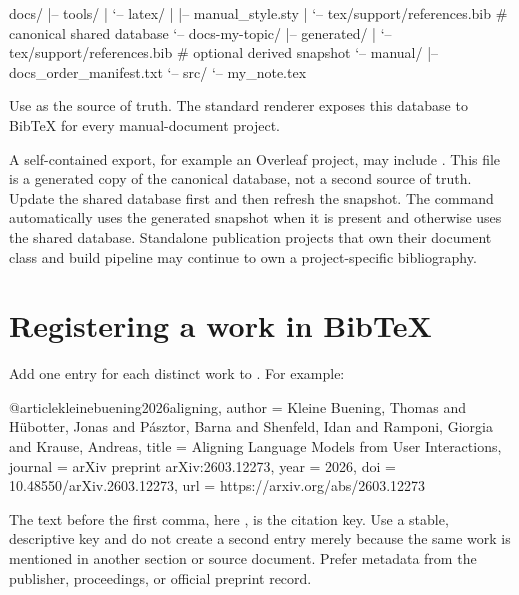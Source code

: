 \begin{DocCode}
docs/
|-- tools/
|   `-- latex/
|       |-- manual_style.sty
|       `-- tex/support/references.bib       # canonical shared database
`-- docs-my-topic/
    |-- generated/
    |   `-- tex/support/references.bib       # optional derived snapshot
    `-- manual/
        |-- docs_order_manifest.txt
        `-- src/
            `-- my_note.tex
\end{DocCode}

Use  as the source of truth.
The standard renderer exposes this database to BibTeX for every manual-document project.

A self-contained export, for example an Overleaf project, may include
.
This file is a generated copy of the canonical database, not a second source of truth.
Update the shared database first and then refresh the snapshot.
The \code{\manualBibliography} command automatically uses the generated snapshot when it is present and otherwise uses the shared database.
Standalone publication projects that own their document class and build pipeline may continue to own a project-specific bibliography.


\section*{Registering a work in BibTeX}

Add one entry for each distinct work to .
For example:

\begin{DocCode}
@article{kleinebuening2026aligning,
  author  = {Kleine Buening, Thomas and H{\"u}botter, Jonas and
             P{\'a}sztor, Barna and Shenfeld, Idan and
             Ramponi, Giorgia and Krause, Andreas},
  title   = {Aligning Language Models from User Interactions},
  journal = {arXiv preprint arXiv:2603.12273},
  year    = {2026},
  doi     = {10.48550/arXiv.2603.12273},
  url     = {https://arxiv.org/abs/2603.12273}
}
\end{DocCode}

The text before the first comma, here , is the citation key.
Use a stable, descriptive key and do not create a second entry merely because the same work is mentioned in another section or source document.
Prefer metadata from the publisher, proceedings, or official preprint record.

